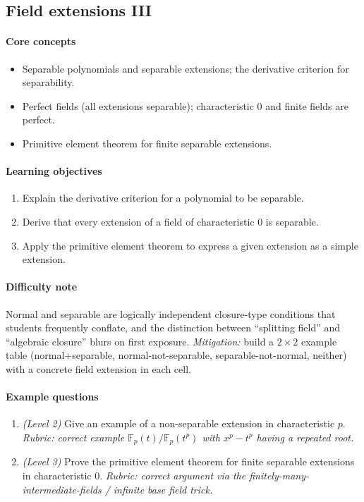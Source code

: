 \documentclass{article}
\begin{document}
\subsection{Field extensions III}
\paragraph{Core concepts}
\begin{itemize}[nosep]
  \item Separable polynomials and separable extensions; the derivative criterion for separability.
  \item Perfect fields (all extensions separable); characteristic 0 and finite fields are perfect.
  \item Primitive element theorem for finite separable extensions.
\end{itemize}
\paragraph{Learning objectives}
\begin{enumerate}[nosep]
  \item Explain the derivative criterion for a polynomial to be separable.
  \item Derive that every extension of a field of characteristic 0 is separable.
  \item Apply the primitive element theorem to express a given extension as a simple extension.
\end{enumerate}
\paragraph{Difficulty note}
Normal and separable are logically independent closure-type conditions that students frequently conflate, and the distinction between ``splitting field'' and ``algebraic closure'' blurs on first exposure. \emph{Mitigation:} build a $2\times2$ example table (normal+separable, normal-not-separable, separable-not-normal, neither) with a concrete field extension in each cell.
\paragraph{Example questions}
\begin{enumerate}[nosep]
  \item \emph{(Level 2)} Give an example of a non-separable extension in characteristic $p$. \emph{Rubric: correct example $\mathbb{F}_p(t)/\mathbb{F}_p(t^p)$ with $x^p - t^p$ having a repeated root.}
  \item \emph{(Level 3)} Prove the primitive element theorem for finite separable extensions in characteristic 0. \emph{Rubric: correct argument via the finitely-many-intermediate-fields / infinite base field trick.}
\end{enumerate}
\end{document}
